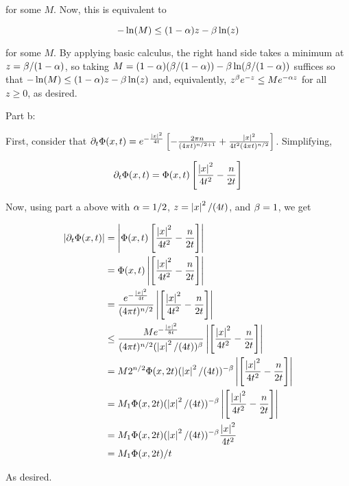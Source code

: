 \documentclass[a4paper,12pt]{article}
\begin{document}
for some $M$. Now, this is equivalent to 

\begin{displaymath}
- \ln(M) \leq (1-\alpha)z - \beta \ln(z)
\end{displaymath}

for some $M$. By applying basic calculus, the right hand side takes a minimum at $z = \beta / (1-\alpha)$, so taking $M = (1-\alpha)(\beta / (1-\alpha)) - \beta \ln(\beta / (1-\alpha))$ suffices so that $-\ln(M) \leq (1-\alpha)z - \beta \ln(z)$ and, equivalently, $z^\beta e^{-z} \leq Me^{-\alpha z}$ for all $z \geq 0$, as desired.

\shunt

Part b:

First, consider that $\partial_t \Phi(x,t) = e^{-\frac{\left\lvert x \right\rvert^2}{4t}} \left[-\frac{2\pi n}{(4\pi t)^{n/2+1}} + \frac{\left\lvert x \right\rvert^2}{4t^2(4 \pi t)^{n/2}}\right]$. Simplifying,

\begin{align*}
\partial_t \Phi(x,t) &= \Phi(x,t) \left[ \frac{\left\lvert x \right\rvert^2}{4t^2} - \frac{n}{2t}\right]\\
\end{align*}

Now, using part a above with $\alpha = 1/2$, $z = \left\lvert x \right\rvert^2/(4t)$, and $\beta = 1$, we get

\begin{align*}
\left\lvert \partial_t \Phi(x,t) \right\rvert &= \left\lvert \Phi(x,t) \left[ \frac{\left\lvert x \right\rvert^2}{4t^2} - \frac{n}{2t}\right] \right\rvert\\
&= \Phi(x,t)\left\lvert \left[ \frac{\left\lvert x \right\rvert^2}{4t^2} - \frac{n}{2t}\right] \right\rvert\\
&= \frac{e^{-\frac{\left\lvert x \right\rvert^2}{4t}}}{(4 \pi t)^{n/2}}\left\lvert \left[ \frac{\left\lvert x \right\rvert^2}{4t^2} - \frac{n}{2t}\right] \right\rvert\\
&\leq \frac{Me^{-\frac{\left\lvert x \right\rvert^2}{8t}}}{(4 \pi t)^{n/2} (\left\lvert x \right\rvert^2/(4t))^\beta}\left\lvert \left[ \frac{\left\lvert x \right\rvert^2}{4t^2} - \frac{n}{2t}\right] \right\rvert\\
&= M2^{n/2} \Phi(x,2t) (\left\lvert x \right\rvert^2/(4t))^{-\beta}\left\lvert \left[ \frac{\left\lvert x \right\rvert^2}{4t^2} - \frac{n}{2t}\right] \right\rvert\\
&= M_1 \Phi(x,2t) (\left\lvert x \right\rvert^2/(4t))^{-\beta}\left\lvert \left[ \frac{\left\lvert x \right\rvert^2}{4t^2} - \frac{n}{2t}\right] \right\rvert\\
&= M_1 \Phi(x,2t) (\left\lvert x \right\rvert^2/(4t))^{-\beta}\frac{\left\lvert x \right\rvert^2}{4t^2}\\
&= M_1 \Phi(x,2t)/t\\
\end{align*}

As desired.
\end{document}
